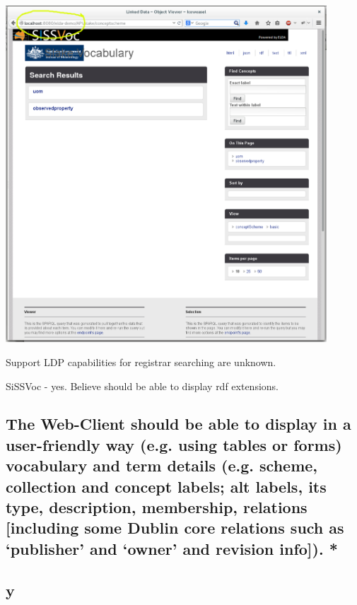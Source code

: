 \documentclass[10pt,a4paper]{article}
\begin{document}
\begin{flushleft}
\includegraphics[width=12cm]{sissvoc}  



% 

Support LDP capabilities for registrar searching are unknown.

SiSSVoc - yes. Believe should be able to display rdf extensions.  




\subsection{ The Web-Client should be able to display in a user-friendly way
(e.g. using tables or forms) vocabulary and term details (e.g. scheme,
collection and concept labels; alt labels, its type, description, membership,
relations [including some Dublin core relations such as ‘publisher’ and ‘owner’
and revision info]). * }






\subsection{y}






  \end{flushleft}
\end{document}

